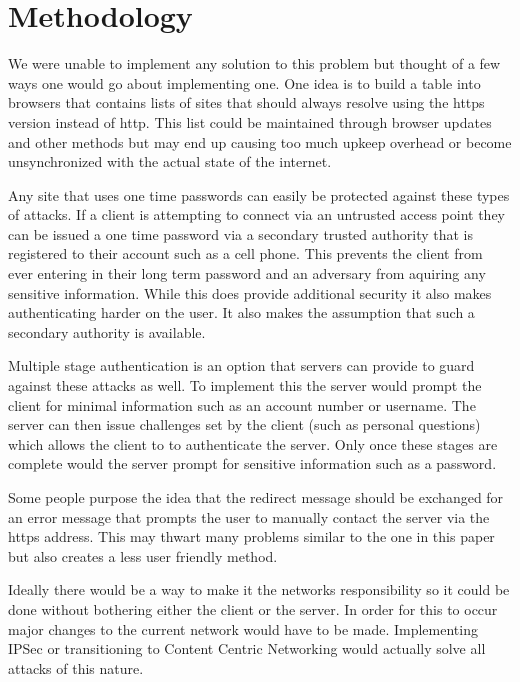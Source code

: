 \documentclass{article}
\begin{document}
\section{Methodology}
We were unable to implement any solution to this problem but thought of a few ways one would go about implementing one.
One idea is to build a table into browsers that contains lists of sites that should always resolve using the https version instead of http.  This list could be maintained through browser updates and other methods but may end up causing too much upkeep overhead or become unsynchronized with the actual state of the internet.

Any site that uses one time passwords can easily be protected against these types of attacks.  If a client is attempting to connect via an untrusted access point they can be issued a one time password via a secondary trusted authority that is registered to their account such as a cell phone.  This prevents the client from ever entering in their long term password and an adversary from aquiring any sensitive information.  While this does provide additional security it also makes authenticating harder on the user.  It also makes the assumption that such a secondary authority is available.

Multiple stage authentication is an option that servers can provide to guard against these attacks as well.  To implement this the server would prompt the client for minimal information such as an account number or username.  The server can then issue challenges set by the client (such as personal questions) which allows the client to to authenticate the server.  Only once these stages are complete would the server prompt for sensitive information such as a password.

Some people purpose the idea that the redirect message should be exchanged for an error message that prompts the user to manually contact the server via the https address.  This may thwart many problems similar to the one in this paper but also creates a less user friendly method.

Ideally there would be a way to make it the networks responsibility so it could be done without bothering either the client or the server.  In order for this to occur major changes to the current network would have to be made.  Implementing IPSec or transitioning to Content Centric Networking would actually solve all attacks of this nature.
\end{document}
